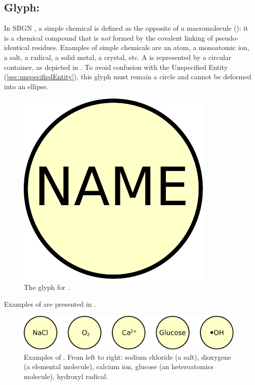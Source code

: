 
\subsection{Glyph: }
\label{sec:simpleChemical}

In SBGN \PDs, a simple chemical is defined as the opposite of a macromolecule (): it is a chemical compound that is \emph{not} formed by the covalent linking of pseudo-identical residues.  Examples of simple chemicals are an atom, a monoatomic ion, a salt, a radical, a solid metal, a crystal, etc. A  is represented by a circular
container, as depicted in . To avoid confusion with the Unspecified Entity (\ref{sec:unspecifiedEntity}), this glyph must remain a circle and cannot be deformed into an ellipse.

\begin{figure}[H]
  \centering
  \includegraphics[scale = 0.3]{images/simpleChemical}
  \caption{The \PD glyph for .}
  \label{fig:simpleChemical}
\end{figure}

Examples of  are presented in .

\begin{figure}[H]
  \centering
  \includegraphics[scale = 0.5]{images/simpleChemical-examples}
  \caption{Examples of . From left to right: sodium chloride (a salt), dioxygene (a elemental molecule), calcium ion, glucose (an heteroatomics molecule), hydroxyl radical.}
  \label{fig:simpleChemical-examples}
\end{figure}
